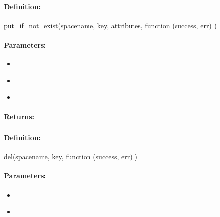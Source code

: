 \paragraph{Definition:}
\begin{javascriptcode}
put_if_not_exist(spacename, key, attributes, function (success, err) {})
\end{javascriptcode}
\paragraph{Parameters:}
\begin{itemize}[noitemsep]
\item {}\\

\item {}\\

\item {}\\

\end{itemize}

\paragraph{Returns:}


\pagebreak
\subsubsection{}
\label{api:nodejs:del}


\paragraph{Definition:}
\begin{javascriptcode}
del(spacename, key, function (success, err) {})
\end{javascriptcode}
\paragraph{Parameters:}
\begin{itemize}[noitemsep]
\item {}\\

\item {}\\

\end{itemize}

